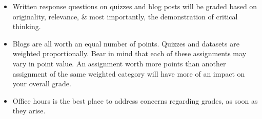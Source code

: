 \vspace{-2mm}\begin{itemize}\justifying 
    \item Written response questions on quizzes and blog posts will be graded based on originality, relevance, \& most importantly, the demonstration of critical thinking. 
    \item Blogs are all worth an equal number of points. Quizzes and datasets are weighted proportionally. Bear in mind that each of these assignments may vary in point value. An assignment worth more points than another assignment of the same weighted category will have more of an impact on your overall grade.
    \item Office hours is the best place to address concerns regarding grades, as soon as they arise.
\end{itemize}
















